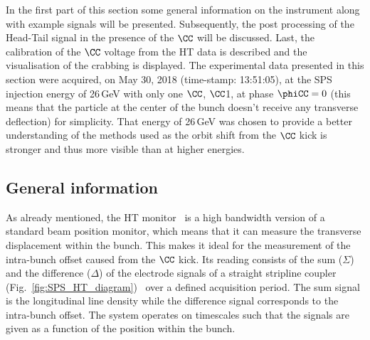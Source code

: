 In the first part of this section some general information on the instrument along with example signals will be presented. Subsequently, the post processing of the Head-Tail signal in the presence of the $\CC$ will be discussed. Last, the calibration of the $\CC$ voltage from the HT data is described and the visualisation of the crabbing is displayed. The experimental data presented in this section were acquired, on May 30, 2018 (time-stamp: 13:51:05), at the SPS injection energy of 26\,GeV with only one $\CC$, $\CC$1, at phase $\phiCC=0$ (this means that the particle at the center of the bunch doesn't receive any transverse deflection) for simplicity. That energy of 26\,GeV was chosen to provide a better understanding of the methods used as the orbit shift from the $\CC$ kick is stronger and thus more visible than at higher energies.


\subsection{General information}\label{subsec:HT_general_info}
As already mentioned, the HT monitor~\cite{sps_headtail_monitor} is a high bandwidth version of a standard beam position monitor, which means that it can measure the transverse displacement within the bunch. This makes it ideal for the measurement of the intra-bunch offset caused from the $\CC$ kick. Its reading consists of the sum ($\Sigma$) and the difference ($\Delta$) of the electrode signals of a straight stripline coupler (Fig.~\ref{fig:SPS_HT_diagram})~\cite{Jones:987561, Levens:2313358} over a defined acquisition period. The sum signal is the longitudinal line density while the difference signal corresponds to the intra-bunch offset. The system operates on timescales such that the signals are given as a function of the position within the bunch.


